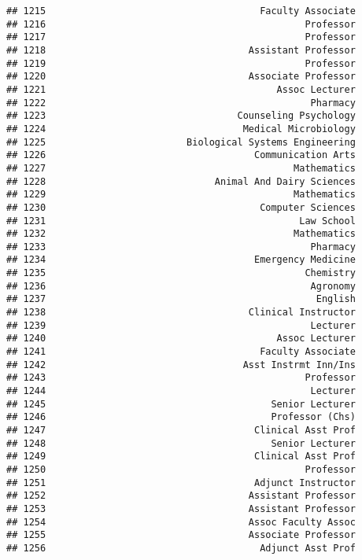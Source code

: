 \documentclass[
]{article}
\begin{document}
\begin{verbatim}
## 1215                                      Faculty Associate
## 1216                                              Professor
## 1217                                              Professor
## 1218                                    Assistant Professor
## 1219                                              Professor
## 1220                                    Associate Professor
## 1221                                         Assoc Lecturer
## 1222                                               Pharmacy
## 1223                                  Counseling Psychology
## 1224                                   Medical Microbiology
## 1225                         Biological Systems Engineering
## 1226                                     Communication Arts
## 1227                                            Mathematics
## 1228                              Animal And Dairy Sciences
## 1229                                            Mathematics
## 1230                                      Computer Sciences
## 1231                                             Law School
## 1232                                            Mathematics
## 1233                                               Pharmacy
## 1234                                     Emergency Medicine
## 1235                                              Chemistry
## 1236                                               Agronomy
## 1237                                                English
## 1238                                    Clinical Instructor
## 1239                                               Lecturer
## 1240                                         Assoc Lecturer
## 1241                                      Faculty Associate
## 1242                                   Asst Instrmt Inn/Ins
## 1243                                              Professor
## 1244                                               Lecturer
## 1245                                        Senior Lecturer
## 1246                                        Professor (Chs)
## 1247                                     Clinical Asst Prof
## 1248                                        Senior Lecturer
## 1249                                     Clinical Asst Prof
## 1250                                              Professor
## 1251                                     Adjunct Instructor
## 1252                                    Assistant Professor
## 1253                                    Assistant Professor
## 1254                                    Assoc Faculty Assoc
## 1255                                    Associate Professor
## 1256                                      Adjunct Asst Prof

\end{verbatim}
\end{document}
